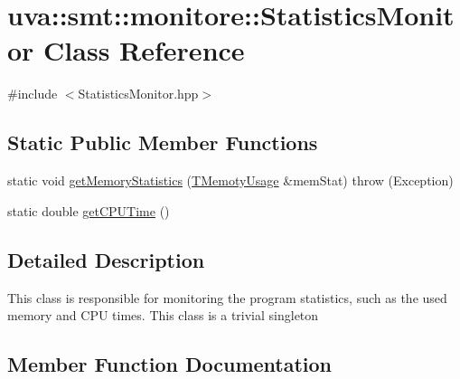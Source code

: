 \hypertarget{classuva_1_1smt_1_1monitore_1_1_statistics_monitor}{}\section{uva\+:\+:smt\+:\+:monitore\+:\+:Statistics\+Monitor Class Reference}
\label{classuva_1_1smt_1_1monitore_1_1_statistics_monitor}


{\ttfamily \#include $<$Statistics\+Monitor.\+hpp$>$}

\subsection*{Static Public Member Functions}
\begin{DoxyCompactItemize}
\item 
static void \hyperlink{classuva_1_1smt_1_1monitore_1_1_statistics_monitor_ad035148c19b9b5dff93a6450fb7635ba}{get\+Memory\+Statistics} (\hyperlink{namespaceuva_1_1smt_1_1monitore_aaa66b205d3960a0507eaa35abcb56374}{T\+Memoty\+Usage} \&mem\+Stat)  throw (\+Exception)
\item 
static double \hyperlink{classuva_1_1smt_1_1monitore_1_1_statistics_monitor_aa3d29b120f9cc6f8bfbbef053a029dd3}{get\+C\+P\+U\+Time} ()
\end{DoxyCompactItemize}


\subsection{Detailed Description}
This class is responsible for monitoring the program statistics, such as the used memory and C\+P\+U times. This class is a trivial singleton 

\subsection{Member Function Documentation}
\hypertarget{classuva_1_1smt_1_1monitore_1_1_statistics_monitor_aa3d29b120f9cc6f8bfbbef053a029dd3}{}
